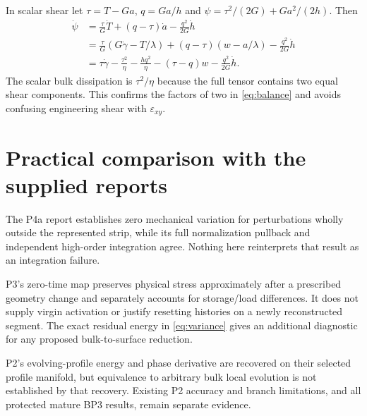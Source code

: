 \documentclass[11pt,a4paper]{article}
\numberwithin{equation}{section}
\begin{document}
In scalar shear let $\tau=T-Ga$, $q=Ga/h$ and
$\psi=\tau^2/(2G)+Ga^2/(2h)$. Then
\begin{align}
 \dot\psi
 &=\frac{\tau}{G}\dot T+(q-\tau)\dot a
      -\frac{q^2}{2G}\dot h\\
 &=\frac{\tau}{G}(G\dot\gamma-T/\lambda)
   +(q-\tau)(w-a/\lambda)-\frac{q^2}{2G}\dot h\\
 &=\tau\dot\gamma-\frac{\tau^2}{\eta}
      -\frac{h q^2}{\eta}-(\tau-q)w
      -\frac{q^2}{2G}\dot h .
\end{align}
The scalar bulk dissipation is $\tau^2/\eta$ because the full tensor
contains two equal shear components. This confirms the factors of two in
\eqref{eq:balance} and avoids confusing engineering shear with
$\varepsilon_{xy}$.

\section{Practical comparison with the supplied reports}

The P4a report establishes zero mechanical variation for perturbations
wholly outside the represented strip, while its full normalization pullback
and independent high-order integration agree. Nothing here reinterprets
that result as an integration failure.

P3's zero-time map preserves physical stress approximately after a prescribed
geometry change and separately accounts for storage/load differences.
It does not supply virgin activation or justify resetting histories on a
newly reconstructed segment. The exact residual energy in
\eqref{eq:variance} gives an additional diagnostic for any proposed
bulk-to-surface reduction.

P2's evolving-profile energy and phase derivative are recovered on their
selected profile manifold, but equivalence to arbitrary bulk local evolution
is not established by that recovery. Existing P2 accuracy and branch
limitations, and all protected mature BP3 results, remain separate evidence.
\end{document}
